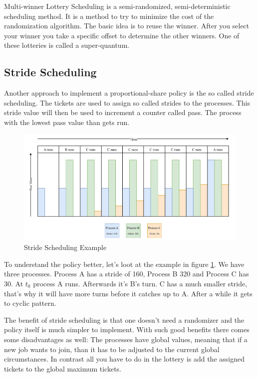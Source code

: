 Multi-winner Lottery Scheduling is a semi-randomized, semi-deterministic scheduling method.
It is a method to try to minimize the cost of the randomization algorithm.
The basic idea is to reuse the winner.
After you select your winner you take a specific offset to determine the other winners.
One of these lotteries is called a super-quantum.

\subsection{Stride Scheduling}

Another approach to implement a proportional-share policy is the so called stride scheduling.
The tickets are used to assign so called strides to the processes.
This stride value will then be used to increment a counter called pass.
The process with the lowest pass value than gets run.

\begin{figure}[h]
    \centering
    \includegraphics[width=\textwidth]{Assets/Stride-Scheduling.pdf}
    \caption{Stride Scheduling Example}
    \label{fig:stride-scheduling}
\end{figure}

To understand the policy better, let's loot at the example in figure \ref{fig:stride-scheduling}.
We have three processes. Process A has a stride of 160, Process B 320 and Process C has 30. At $t_0$ process A runs. Afterwards it's B's turn. C has a much smaller stride, that's why it will have more turns before it catches up to A.
After a while it gets to cyclic pattern.


The benefit of stride scheduling is that one doesn't need a randomizer and the policy itself is much simpler to implement. With such good benefits there comes some disadvantages as well: The processes have global values, meaning that if a new job wants to join, than it has to be adjusted to the current global circumstances. In contrast all you have to do in the lottery is add the assigned tickets to the global maximum tickets.

